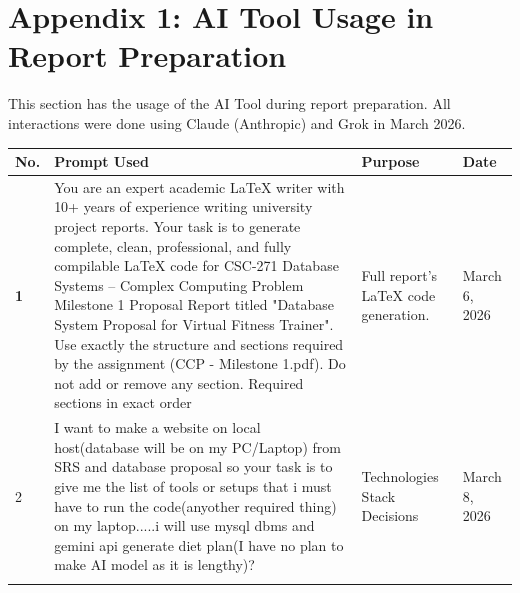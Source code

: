 \documentclass[12pt,a4paper]{article}
\begin{document}
\newpage
\appendix
\section{Appendix 1: AI Tool Usage in Report Preparation}

This section has the usage of the AI Tool during report preparation. All interactions were done using Claude (Anthropic) and Grok
in March 2026.

\begin{longtable}{>{\bfseries}p{0.6cm} p{5.5cm} p{5cm} p{2.5cm}}
\toprule
\textbf{No.} & \textbf{Prompt Used} & \textbf{Purpose} & \textbf{Date} \\
\midrule
\endhead

1 &
You are an expert academic LaTeX writer with 10+ years of experience writing university project reports. Your task is to generate complete, clean, professional, and fully compilable LaTeX code for CSC-271 Database Systems – Complex Computing Problem Milestone 1 Proposal Report titled "Database System Proposal for Virtual Fitness Trainer".
Use exactly the structure and sections required by the assignment (CCP - Milestone 1.pdf). Do not add or remove any section.
Required sections in exact order &
Full report's LaTeX code generation. &
March 6, 2026 \\
\addlinespace

2 &
I want to make a website on local host(database will be on my PC/Laptop) from SRS and database proposal so your task is to give me the list of tools or setups that i must have to run the code(anyother required thing) on my laptop.....i will use mysql dbms and gemini api generate diet plan(I have no plan to make AI model as it is lengthy)? &
Technologies Stack Decisions &
March 8, 2026\\
\addlinespace


\end{longtable}
\end{document}
